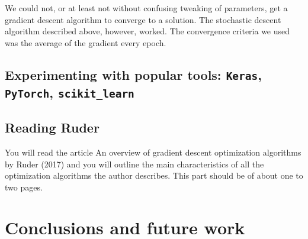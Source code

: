 \documentclass[a4paper]{article}
\begin{document}
We could not, or at least not without confusing tweaking of parameters, get a gradient descent algorithm to converge to a solution. The stochastic descent algorithm described above, however, worked. The convergence criteria we used was the average of the gradient every epoch.

\subsection{Experimenting with popular tools: \texttt{Keras}, \texttt{PyTorch}, \texttt{scikit\_learn}}

\subsection{Reading Ruder}
You will read the article An overview of gradient descent optimization algorithms by Ruder (2017) and you will outline the main characteristics of all the optimization algorithms the author describes. This part should be of about one to two pages. 
\cite{DBLP:journals/corr/Ruder16}


\section{Conclusions and future work}


\printbibliography
\end{document}
